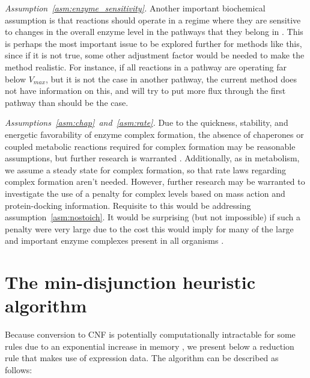 \emph{Assumption~\ref{asm:enzyme_sensitivity}.}
Another important biochemical assumption is that reactions should
operate in a regime where they are sensitive to changes in the overall
enzyme level in the pathways that they belong in
\citep{Bennett2009,Chubukov2013}. This is perhaps the most important
issue to be explored further for methods like this, since if it is not
true, some other adjustment factor would be needed to make the method
realistic. For instance, if all reactions in a pathway are operating
far below $V_{max}$, but it is not the case in another pathway, the
current method does not have information on this, and will try to put
more flux through the first pathway than should be the case.

\emph{Assumptions~\ref{asm:chap}~and~\ref{asm:rate}.}
Due to the quickness, stability, and energetic favorability of enzyme
complex formation, the absence of chaperones or coupled metabolic
reactions required for complex formation may be reasonable
assumptions, but further research is warranted \citep{Karr2012}.
Additionally, as in metabolism, we assume a steady state for complex
formation, so that rate laws regarding complex formation aren't
needed. However, further research may be warranted to investigate the
use of a penalty for complex levels based on mass action and
protein-docking information. Requisite to this would be addressing
assumption~\ref{asm:nostoich}. It would be surprising (but not
impossible) if such a penalty were very large due to the cost this
would imply for many of the large and important enzyme complexes
present in all organisms \citep{Nelson2008}.

\section{The min-disjunction heuristic algorithm}
\label{sec:HeuristicToCNF}
Because conversion to CNF is potentially computationally intractable 
for some rules due to an  exponential increase in memory \citep{Russell2009}, we
present below a reduction rule that makes use of expression data.
The algorithm can be described as follows:

